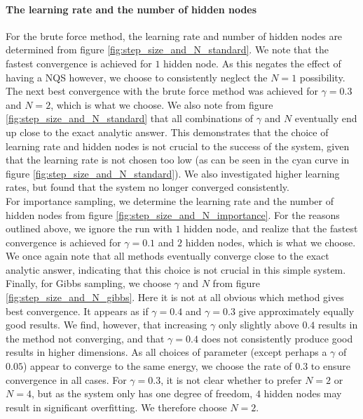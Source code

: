 \documentclass[a4paper, 10pt]{article}
\begin{document}
\paragraph{The learning rate and the number of hidden nodes}
For the brute force method, the learning rate and number of hidden nodes are determined from figure \ref{fig:step_size_and_N_standard}.  We note that the fastest convergence is achieved for $1$ hidden node. As this negates the effect of having a NQS however, we choose to consistently neglect the $N=1$ possibility. The next best convergence with the brute force method was achieved for $\gamma=0.3$ and $N=2$, which is what we choose. We also note from figure \ref{fig:step_size_and_N_standard} that all combinations of $\gamma$ and $N$ eventually end up close to the exact analytic answer. This demonstrates that the choice of learning rate and hidden nodes is not crucial to the success of the system, given that the learning rate is not chosen too low (as can be seen in the cyan curve in figure \ref{fig:step_size_and_N_standard}). We also investigated higher learning rates, but found that the system no longer converged consistently.\\
\linebreak
For importance sampling, we determine the learning rate and the number of hidden nodes from figure \ref{fig:step_size_and_N_importance}. For the reasons outlined above, we ignore the run with $1$ hidden node, and realize that the fastest convergence is achieved for $\gamma=0.1$ and $2$ hidden nodes, which is what we choose. We once again note that all methods eventually converge close to the exact analytic answer, indicating that this choice is not crucial in this simple system.\\
\linebreak
Finally, for Gibbs sampling, we choose $\gamma$ and $N$ from figure \ref{fig:step_size_and_N_gibbs}. Here it is not at all obvious which method gives best convergence. It appears as if $\gamma=0.4$ and $\gamma=0.3$ give approximately equally good results. We find, however, that increasing $\gamma$ only slightly above $0.4$ results in the method not converging, and that $\gamma=0.4$ does not consistently produce good results in higher dimensions. As all choices of parameter (except perhaps a $\gamma$ of $0.05$) appear to converge to the same energy, we choose the rate of $0.3$ to ensure convergence in  all cases. For $\gamma=0.3$, it is not clear whether to prefer $N=2$ or $N=4$, but as the system only has one degree of freedom, $4$ hidden nodes may result in significant overfitting. We therefore choose $N=2$.
\end{document}
